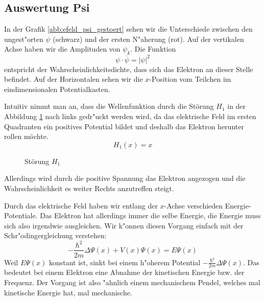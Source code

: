 \begin{refsection}
\subsection{Auswertung Psi}

In der Grafik \ref{abb:efeld_psi_gestoert} sehen wir die Unterschiede zwischen den ungest"orten 
$\psi$ (schwarz) und der ersten N"aherung (rot).
Auf der vertikalen Achse haben wir die Amplituden von $\psi_k$.
Die Funktion 
\[
  \psi \cdot \overline{\psi} = |\psi|^2
\]
entspricht der Wahrscheinlichkeitsdichte, 
dass sich das Elektron an dieser Stelle befindet.
Auf der Horizontalen sehen wir die $x$-Position vom Teilchen im eindimensionalen Potentialkasten.

Intuitiv nimmt man an, dass die Wellenfunktion durch die St\"orung $H_1$ in der Abbildung 
\ref{abb:efeld_H_1} nach links gedr"uckt werden wird, da das elektrische Feld 
im ersten Quadranten ein positives Potential bildet und deshalb das Elektron herunter rollen m\"ochte.
\[
  H_1(x) = x
\]

\begin{figure}
  \centering
{}
 \caption{St\"orung $H_1$}
 \label{abb:efeld_H_1}
\end{figure}

Allerdings wird durch die positive Spannung das Elektron angezogen und die
Wahrscheinlichkeit es weiter Rechts anzutreffen steigt.

Durch das elektrische Feld haben wir entlang der $x$-Achse verschieden Energie-Potentiale.
Das Elektron hat allerdings immer die selbe Energie,
die Energie muss sich also irgendwie ausgleichen.
Wir k"onnen diesen Vorgang einfach mit der Schr"odingergleichung verstehen:
\[
-\frac{\hbar^2}{2m}\Delta\Psi(x) + V(x)\Psi(x)
=
E \Psi(x)
\]
Weil $E \Psi(x)$ konstant ist, sinkt bei einem h"oherem Potential $-\frac{\hbar^2}{2m}\Delta\Psi(x)$.
Das bedeutet bei einem Elektron eine Abnahme der kinetischen Energie bzw. der Frequenz.
Der Vorgang ist also "ahnlich einem mechanischem Pendel, 
welches mal kinetische Energie hat, mal mechanische.


\end{refsection}

